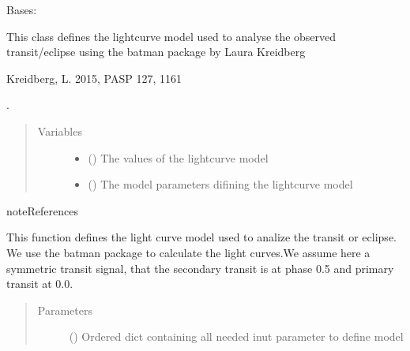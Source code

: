 \documentclass[a4paper,11pt,english]{sphinxmanual}
\begin{document}

\begin{fulllineitems}
\label{\detokenize{cascade.exoplanet_tools:cascade.exoplanet_tools.exoplanet_tools.batman_model}}
Bases: 

This class defines the lightcurve model used to analyse the observed
transit/eclipse using the batman package by Laura Kreidberg %
\begin{footnote}[1]\sphinxAtStartFootnote
Kreidberg, L. 2015, PASP 127, 1161
%
\end{footnote}.
\begin{quote}\begin{description}
\item[{Variables}] \leavevmode\begin{itemize}
\item {} 
 () \textendash{} The values of the lightcurve model

\item {} 
 () \textendash{} The model parameters difining the lightcurve model

\end{itemize}

\end{description}\end{quote}

\begin{sphinxadmonition}{note}{References}
\end{sphinxadmonition}

\begin{fulllineitems}
\label{\detokenize{cascade.exoplanet_tools:cascade.exoplanet_tools.exoplanet_tools.batman_model.define_batman_model}}
This function defines the light curve model used to analize the
transit or eclipse. We use the batman package to calculate the
light curves.We assume here a symmetric transit signal, that the
secondary transit is at phase 0.5 and primary transit at 0.0.
\begin{quote}\begin{description}
\item[{Parameters}] \leavevmode
{} () \textendash{} Ordered dict containing all needed inut parameter to define model


\end{description}
\end{quote}
\end{fulllineitems}
\end{fulllineitems}
\end{document}
